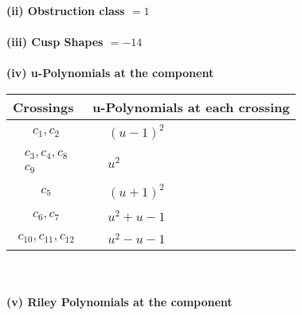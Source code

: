\documentclass[1p]{elsarticle_modified}
\theoremstyle{definition}
\begin{document}
\flushleft \textbf{(ii) Obstruction class $= 1$}\\~\\
\flushleft \textbf{(iii) Cusp Shapes $= -14$}\\~\\
\newpage\renewcommand{\arraystretch}{1}
\flushleft \textbf{(iv) u-Polynomials at the component}\newline \\
\begin{tabular}{m{50pt}|m{274pt}}
Crossings & \hspace{64pt}u-Polynomials at each crossing \\
\hline $$\begin{aligned}c_{1},c_{2}\end{aligned}$$&$\begin{aligned}
&(u-1)^2
\end{aligned}$\\
\hline $$\begin{aligned}c_{3},c_{4},c_{8}\\c_{9}\end{aligned}$$&$\begin{aligned}
&u^2
\end{aligned}$\\
\hline $$\begin{aligned}c_{5}\end{aligned}$$&$\begin{aligned}
&(u+1)^2
\end{aligned}$\\
\hline $$\begin{aligned}c_{6},c_{7}\end{aligned}$$&$\begin{aligned}
&u^2+u-1
\end{aligned}$\\
\hline $$\begin{aligned}c_{10},c_{11},c_{12}\end{aligned}$$&$\begin{aligned}
&u^2- u-1
\end{aligned}$\\
\hline
\end{tabular}\\~\\
\newpage\renewcommand{\arraystretch}{1}
\flushleft \textbf{(v) Riley Polynomials at the component}\newline \\
\end{document}
